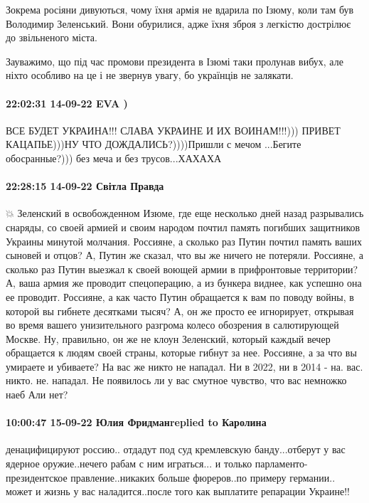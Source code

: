 Зокрема росіяни дивуються, чому їхня армія не вдарила по Ізюму, коли там був Володимир Зеленський. Вони обурилися, адже їхня зброя з легкістю дострілює до звільненого міста.

Зауважимо, що під час промови президента в Ізюмі таки пролунав вибух, але ніхто особливо на це і не звернув увагу, бо українців не залякати.

\paragraph{22:02:31 14-09-22 EVA )}

ВСЕ БУДЕТ УКРАИНА!!! СЛАВА УКРАИНЕ И ИХ ВОИНАМ!!!))) ПРИВЕТ КАЦАПЬЕ)))НУ ЧТО
ДОЖДАЛИСЬ?))))Пришли с мечом ...Бегите обосранные?))) без меча и без
трусов...ХАХАХА


\paragraph{22:28:15 14-09-22 Світла Правда}

💥 Зеленский в освобожденном Изюме, где еще несколько дней назад разрывались снаряды, со своей армией и своим народом почтил память погибших защитников Украины минутой молчания.
Россияне, а сколько раз Путин почтил память ваших сыновей и отцов? А, Путин же сказал, что вы же ничего не потеряли.
Россияне, а сколько раз Путин выезжал к своей воющей армии в прифронтовые территории? А, ваша армия же проводит спецоперацию, а из бункера виднее, как успешно она ее проводит.
Россияне, а как часто Путин обращается к вам по поводу войны, в которой вы гибнете десятками тысяч? А, он же просто ее игнорирует, открывая во время вашего унизительного разгрома колесо обозрения в салютирующей Москве. Ну, правильно, он же не клоун Зеленский, который каждый вечер обращается к людям своей страны, которые гибнут за нее.
Россияне, а за что вы умираете и убиваете? На вас же никто не нападал. Ни в 2022, ни в 2014 - на. вас. никто. не. нападал.
Не появилось ли у вас смутное чувство, что вас немножко наеб
Али нет?

\paragraph{10:00:47 15-09-22 Юлия Фридманreplied to Каролина}

денацифицируют россию.. отдадут под суд кремлевскую банду...отберут у вас
ядерное оружие..нечего рабам с ним играться... и только
парламенто-президентское правление..никаких больше фюреров..по примеру
германии.. может и жизнь у вас наладится..после того как выплатите репарации
Украине!!


